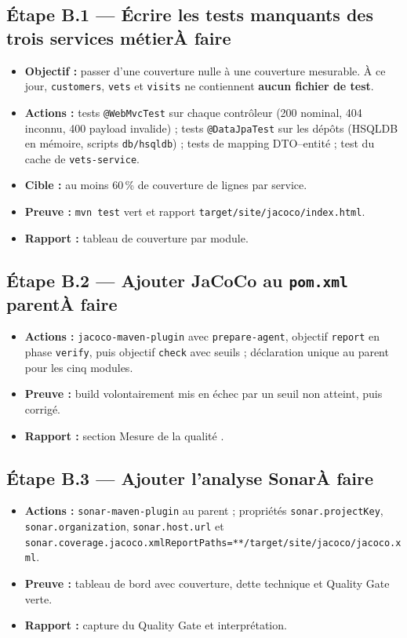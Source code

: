 \documentclass[12pt,a4paper]{article}
\newcommand{\code}[1]{\texttt{\small #1}}
\newcommand{\fait}{\hfill\textcolor{green!45!black}{\small\textbf{Fait}}}
\newcommand{\afaire}{\hfill\textcolor{orange!80!black}{\small\textbf{\`A faire}}}
\newcommand{\etape}[2]{%
  \subsection*{#1\ifstrequal{#2}{f}{\fait}{\afaire}}%
}
\begin{document}
\etape{\'Etape B.1 --- \'Ecrire les tests manquants des trois services m\'etier}{a}
\begin{itemize}[leftmargin=1.4em,itemsep=0.1em]
  \item \textbf{Objectif :} passer d'une couverture nulle \`a une couverture mesurable.
        \`A ce jour, \code{customers}, \code{vets} et \code{visits} ne contiennent
        \textbf{aucun fichier de test}.
  \item \textbf{Actions :} tests \code{@WebMvcTest} sur chaque contr\^oleur (200 nominal,
        404 inconnu, 400 payload invalide) ; tests \code{@DataJpaTest} sur les d\'ep\^ots
        (HSQLDB en m\'emoire, scripts \code{db/hsqldb}) ; tests de mapping DTO--entit\'e ;
        test du cache de \code{vets-service}.
  \item \textbf{Cible :} au moins 60\,\% de couverture de lignes par service.
  \item \textbf{Preuve :} \code{mvn test} vert et rapport \code{target/site/jacoco/index.html}.
  \item \textbf{Rapport :} tableau de couverture par module.
\end{itemize}

\etape{\'Etape B.2 --- Ajouter JaCoCo au \code{pom.xml} parent}{a}
\begin{itemize}[leftmargin=1.4em,itemsep=0.1em]
  \item \textbf{Actions :} \code{jacoco-maven-plugin} avec \code{prepare-agent},
        objectif \code{report} en phase \code{verify}, puis objectif \code{check}
        avec seuils ; d\'eclaration unique au parent pour les cinq modules.
  \item \textbf{Preuve :} build volontairement mis en \'echec par un seuil non atteint, puis corrig\'e.
  \item \textbf{Rapport :} section \guillemotleft{} Mesure de la qualit\'e \guillemotright{}.
\end{itemize}

\etape{\'Etape B.3 --- Ajouter l'analyse Sonar}{a}
\begin{itemize}[leftmargin=1.4em,itemsep=0.1em]
  \item \textbf{Actions :} \code{sonar-maven-plugin} au parent ; propri\'et\'es
        \code{sonar.projectKey}, \code{sonar.organization}, \code{sonar.host.url} et
        \code{sonar.coverage.jacoco.xmlReportPaths=**/target/site/jacoco/jacoco.xml}.
  \item \textbf{Preuve :} tableau de bord avec couverture, dette technique et Quality Gate verte.
  \item \textbf{Rapport :} capture du Quality Gate et interpr\'etation.
\end{itemize}
\end{document}

